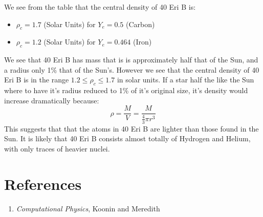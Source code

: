 \documentclass[a4paper]{IEEEtran}
\newcommand{\showcode}[1]{\begin{mdframed}[style=code] %
                          \end{mdframed}%
}
\begin{document}
We see from the table that the central density of 40 Eri B is:
\begin{itemize}
    \item $\rho_c = 1.7$ (Solar Units) for $Y_e = 0.5$ (Carbon)
    \item $\rho_c = 1.2$ (Solar Units) for $Y_e = 0.464$ (Iron)
\end{itemize}
We see that 40 Eri B has mass that is is approximately half that of
the Sun, and a radius only 1\% that of the Sun's. However we see that
the central density of 40 Eri B is in the range $1.2 \leq \rho_c \leq 1.7$
in solar units. If a star half the like the Sun where to have it's radius 
reduced to 1\% of it's original size, it's density would increase
dramatically because:
\[ \rho = \frac{M}{V} = \frac{M}{\frac{4}{3} \pi r^3} \]
This suggests that that the atoms in 40 Eri B are lighter than those
found in the Sun. It is likely that 40 Eri B consists almost totally
of Hydrogen and Helium, with only traces of heavier nuclei.

\section{References}
    \begin{enumerate}
        \item \emph{Computational Physics}, Koonin and Meredith
    \end{enumerate} 



\onecolumn
{}
\showcode{src/star.f} 
\end{document}
